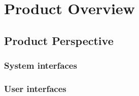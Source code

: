 \documentclass{scrreprt}
\begin{document}
\section{Product Overview}

\subsection{Product Perspective}


\subsubsection{System interfaces}


\subsubsection{User interfaces}
\end{document}
